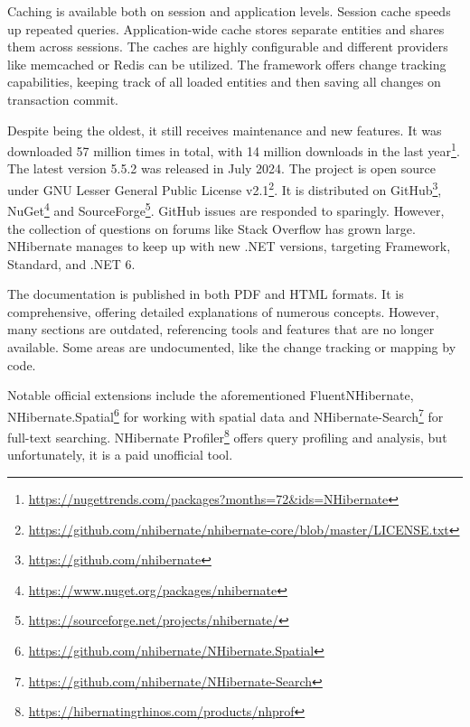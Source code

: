 Caching is available both on session and application levels. Session cache speeds up repeated queries. Application-wide cache stores separate entities and shares them across sessions. The caches are highly configurable and different providers like memcached or Redis can be utilized.
The framework offers change tracking capabilities, keeping track of all loaded entities and then saving all changes on transaction commit.

Despite being the oldest, it still receives maintenance and new features. It was downloaded 57 million times in total, with 14 million downloads in the last year\footnote{\url{https://nugettrends.com/packages?months=72&ids=NHibernate}}. The latest version 5.5.2 was released in July 2024. The project is open source under GNU Lesser General Public License v2.1\footnote{\url{https://github.com/nhibernate/nhibernate-core/blob/master/LICENSE.txt}}. It is distributed on GitHub\footnote{\url{https://github.com/nhibernate}}, NuGet\footnote{\url{https://www.nuget.org/packages/nhibernate}} and SourceForge\footnote{\url{https://sourceforge.net/projects/nhibernate/}}. GitHub issues are responded to sparingly. However, the collection of questions on forums like Stack Overflow has grown large. NHibernate manages to keep up with new .NET versions, targeting Framework, Standard, and .NET 6.

The documentation is published in both PDF and HTML formats. It is comprehensive, offering detailed explanations of numerous concepts. However, many sections are outdated, referencing tools and features that are no longer available. Some areas are undocumented, like the change tracking or mapping by code.

Notable official extensions include the aforementioned FluentNHibernate, {NHibernate.Spatial}\footnote{\url{https://github.com/nhibernate/NHibernate.Spatial}} for working with spatial data and NHibernate-Search\footnote{\url{https://github.com/nhibernate/NHibernate-Search}} for full-text searching. NHibernate Profiler\footnote{\url{https://hibernatingrhinos.com/products/nhprof}} offers query profiling and analysis, but unfortunately, it is a paid unofficial tool. 

